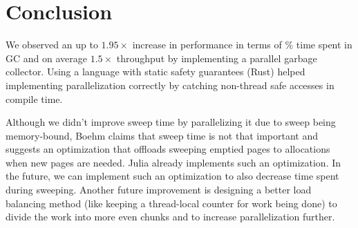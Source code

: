 \section{Conclusion} \label{conclusion}

We observed an up to $1.95\times$ increase in performance in terms of \% time spent in GC and on average $1.5\times$ throughput by implementing a parallel garbage collector. Using a language with static safety guarantees (Rust) helped implementing parallelization correctly by catching non-thread safe accesses in compile time.

Although we didn't improve sweep time by parallelizing it due to sweep being memory-bound, Boehm\cite{boehm's paper} claims that sweep time is not that important and suggests an optimization that offloads sweeping emptied pages to allocations when new pages are needed. Julia already implements such an optimization. In the future, we can implement such an optimization to also decrease time spent during sweeping. Another future improvement is designing a better load balancing method (like keeping a thread-local counter for work being done) to divide the work into more even chunks and to increase parallelization further.

